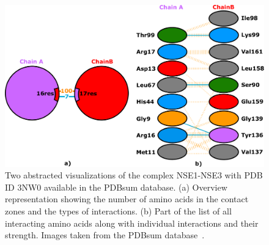 \documentclass{bmcart}
\begin{document}
\begin{backmatter}
\begin{figure}[h!]
  \centering	
  \includegraphics[width=\columnwidth]{images/figure2.pdf}
  \caption{
    Two abstracted visualizations of the complex NSE1-NSE3 with PDB ID 3NW0 available in the 		PDBsum database. (a) Overview representation showing the number of amino acids in the 			contact zones and the types of interactions. (b) Part of the list of all interacting amino 		acids along with individual interactions and their strength. Images taken from the PDBsum 		database~\cite{pdbsum}.}
\end{figure}


\end{backmatter}
\end{document}
